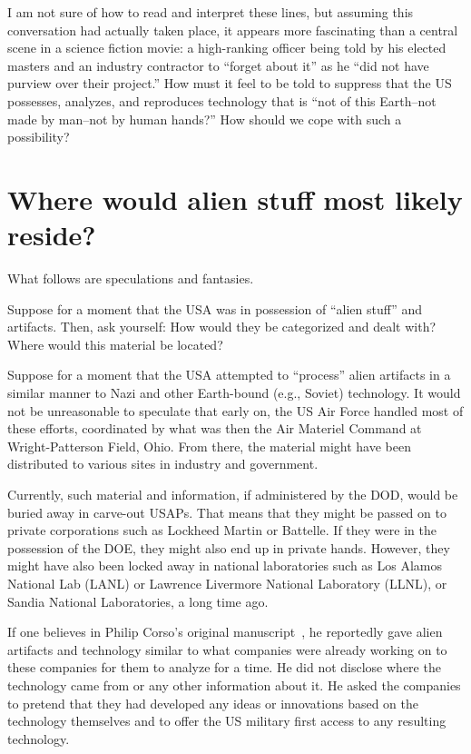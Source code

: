 I am not sure of how to read and interpret these lines, but assuming this conversation had actually taken place, it appears more fascinating than a central scene in a science fiction movie: a high-ranking officer being told by his elected masters and an industry contractor to ``forget about it'' as he ``did not have purview over their project.'' How must it feel to be told to suppress that the US possesses, analyzes, and reproduces technology that is ``not of this Earth--not made by man--not by human hands?'' How should we cope with such a possibility?


\section{Where would alien stuff most likely reside?}
\label{2023-UFO-part-Perception-crash-retreivals-where}


What follows are speculations and fantasies.

Suppose for a moment that the USA was in possession of ``alien stuff'' and artifacts. Then, ask yourself: How would they be categorized and dealt with? Where would this material be located?

Suppose for a moment that the USA attempted to ``process'' alien artifacts in a similar manner to Nazi and other Earth-bound (e.g., Soviet) technology. It would not be unreasonable to speculate that early on, the US Air Force handled most of these efforts, coordinated by what was then the Air Materiel Command at Wright-Patterson Field, Ohio. From there, the material might have been distributed to various sites in industry and government.

Currently, such material and information, if administered by the DOD, would be buried away in carve-out USAPs. That means that they might be passed on to private corporations such as Lockheed Martin or Battelle. If they were in the possession of the DOE, they might also end up in private hands. However, they might have also been locked away in national laboratories such as Los Alamos National Lab (LANL) or Lawrence Livermore National Laboratory (LLNL), or Sandia National Laboratories, a long time ago.

If one believes in Philip Corso's original manuscript~\cite{Corso}, he reportedly gave alien artifacts and technology similar to what companies were already working on to these companies for them to analyze for a time. He did not disclose where the technology came from or any other information about it. He asked the companies to pretend that they had developed any ideas or innovations based on the technology themselves and to offer the US military first access to any resulting technology.

